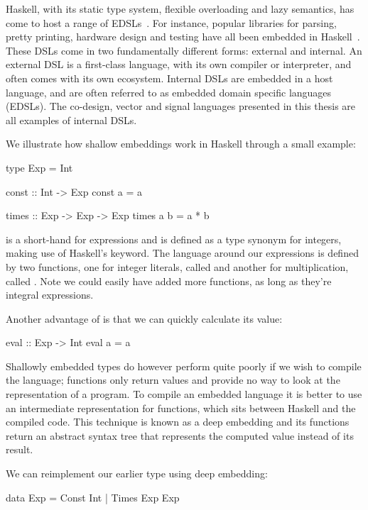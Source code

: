 \documentclass[../paper.tex]{subfiles}
\begin{document}
Haskell, with its static type system, flexible overloading and lazy semantics, has come to host a range of EDSLs~\cite{elliott2003}. For instance, popular libraries for parsing, pretty printing, hardware design and testing have all been embedded in Haskell~\cite{leijen2002, hughes1995, bjesse1998}. These DSLs come in two fundamentally different forms: external and internal. An external DSL is a first-class language, with its own compiler or interpreter, and often comes with its own ecosystem. Internal DSLs are embedded in a host language, and are often referred to as embedded domain specific languages (EDSLs). The co-design, vector and signal languages presented in this thesis are all examples of internal DSLs.

We illustrate how shallow embeddings work in Haskell through a small example:

\begin{code}
type Exp = Int

const :: Int -> Exp
const a = a

times :: Exp -> Exp -> Exp
times a b = a * b
\end{code}

\noindent {} is a short-hand for expressions and is defined as a type synonym for integers, making use of Haskell's  keyword. The language around our expressions is defined by two functions, one for integer literals, called  and another for multiplication, called . Note we could easily have added more functions, as long as they're integral expressions.

Another advantage of  is that we can quickly calculate its value:

\begin{code}
eval :: Exp -> Int
eval a = a
\end{code}

\noindent Shallowly embedded types do however perform quite poorly if we wish to compile the language; functions only return values and provide no way to look at the representation of a program. To compile an embedded language it is better to use an intermediate representation for functions, which sits between Haskell and the compiled code. This technique is known as a deep embedding and its functions return an abstract syntax tree that represents the computed value instead of its result.

We can reimplement our earlier  type using deep embedding:

\begin{code}
data Exp = Const Int | Times Exp Exp
\end{code}
\end{document}
